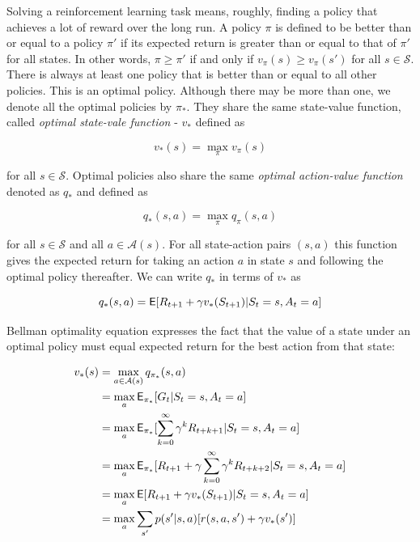 \documentclass[a4paper]{article}
\begin{document}
Solving a reinforcement learning task means, roughly, finding a policy that achieves a lot of reward over the long run.  A policy $\pi$ is defined to be better than or equal to a policy $\pi'$ if its expected return is greater than or equal to that of $\pi'$ for all states. In other words, $\pi \geq \pi'$ if and only if $v_{\pi}(s) \geq v_{\pi}(s')$ for all $s\in \mathcal{S}$. There is always at least one policy that is better than or equal to all other policies. This is an optimal policy. Although there may be more than one, we denote all the optimal policies by $\pi_{*}$. They share the same state-value function, called \textit{optimal state-vale function} - $v_{*}$ defined as 

\begin{equation}
v_{*}(s) = \max_{\pi}v_{\pi}(s) 
\end{equation}

for all $s\in \mathcal{S}$. Optimal policies also share the same \textit{optimal action-value function} denoted as $q_{*}$ and defined as

\begin{equation}
q_{*}(s,a) = \max_{\pi}q_{\pi}(s,a) 
\end{equation}

for all $s \in \mathcal{S}$ and all $a \in \mathcal{A}(s)$. For all state-action pairs $(s,a)$ this function gives the expected return for taking an action $a$ in state $s$ and following the optimal policy thereafter. We can write $q_{*}$ in terms of $v_{*}$ as

\begin{equation}
q_{*}(s,a) = \operatorname{\mathsf{E}}[R_{t+1} + \gamma v_{*}(S_{t+1}) | S_t = s, A_t = a]
\end{equation}

Bellman optimality equation expresses the fact that the value of a state under an optimal policy must equal expected return for the best action from that state:

\begin{align*}
v_{*}(s) &=\max_{a \in \mathcal{A}(s)}q_{\pi_{*}}(s,a) \\
&= \max_{a}\operatorname{\mathsf{E}}_{\pi_{*}}[G_t | S_t = s, A_t = a] \\
&= \max_{a}\operatorname{\mathsf{E}}_{\pi_{*}}[\sum\limits_{k=0}^{\infty}\gamma^{k}R_{t+k+1}|S_t = s, A_t = a] \\
&= \max_{a}\operatorname{\mathsf{E}}_{\pi_{*}}[R_{t+1} + \gamma\sum\limits_{k=0}^{\infty}\gamma^{k}R_{t+k+2}|S_t = s, A_t = a] \\
&=  \max_{a}\operatorname{\mathsf{E}}[R_{t+1} + \gamma v_{*}(S_{t+1})| S_t = s, A_t = a]\\
& =  \max_{a}\sum\limits_{s'}p(s'|s,a)[r(s,a,s') + \gamma v_{*}(s')]
\end{align*}
\end{document}
